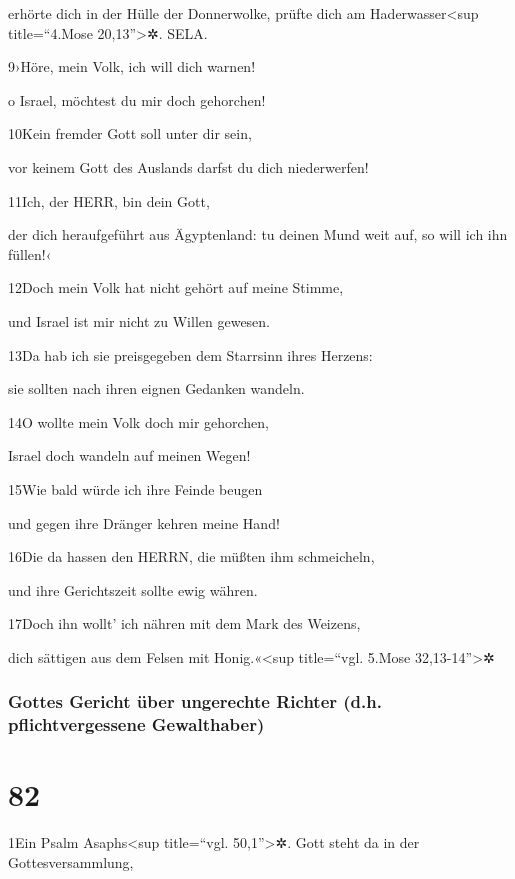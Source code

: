 erhörte dich in der Hülle der Donnerwolke, prüfte dich am
Haderwasser\textless sup title=``4.Mose 20,13''\textgreater✲. SELA.

9›Höre, mein Volk, ich will dich warnen!

o Israel, möchtest du mir doch gehorchen!

10Kein fremder Gott soll unter dir sein,

vor keinem Gott des Auslands darfst du dich niederwerfen!

11Ich, der HERR, bin dein Gott,

der dich heraufgeführt aus Ägyptenland: tu deinen Mund weit auf, so will
ich ihn füllen!‹

12Doch mein Volk hat nicht gehört auf meine Stimme,

und Israel ist mir nicht zu Willen gewesen.

13Da hab ich sie preisgegeben dem Starrsinn ihres Herzens:

sie sollten nach ihren eignen Gedanken wandeln.

14O wollte mein Volk doch mir gehorchen,

Israel doch wandeln auf meinen Wegen!

15Wie bald würde ich ihre Feinde beugen

und gegen ihre Dränger kehren meine Hand!

16Die da hassen den HERRN, die müßten ihm schmeicheln,

und ihre Gerichtszeit sollte ewig währen.

17Doch ihn wollt' ich nähren mit dem Mark des Weizens,

dich sättigen aus dem Felsen mit Honig.«\textless sup title=``vgl.
5.Mose 32,13-14''\textgreater✲

\hypertarget{gottes-gericht-uxfcber-ungerechte-richter-d.h.-pflichtvergessene-gewalthaber}{%
\subsubsection{Gottes Gericht über ungerechte Richter (d.h.
pflichtvergessene
Gewalthaber)}\label{gottes-gericht-uxfcber-ungerechte-richter-d.h.-pflichtvergessene-gewalthaber}}

\hypertarget{section-81}{%
\section{82}\label{section-81}}

1Ein Psalm Asaphs\textless sup title=``vgl. 50,1''\textgreater✲. Gott
steht da in der Gottesversammlung,

